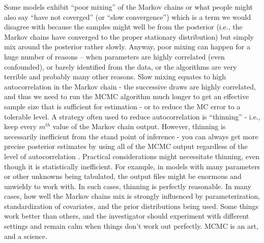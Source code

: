 Some models exhibit ``poor mixing'' of the Markov chains or what
people might also say ``have not coverged'' (or ``slow convergence'')
which is a term we would disagree with because the samples might well
be from the posterior (i.e., the Markov chains have converged to the
proper stationary distribution) but simply mix around the posterior
rather slowly. Anyway, poor mixing can happen for a huge number of
reasons -- when parameters are highly correlated (even confounded), or
barely identified from the data, or the algorithms are very terrible
and probably many other reasons.  Slow mixing equates to high
autocorrelation in the Markov chain - the successive draws are highly
correlated, and thus we need to run the MCMC algorithm much longer to
get an effective sample size that is sufficient for estimation - or to
reduce the MC error to a tolerable level.  A strategy often used to
reduce autocorrelation is ``thinning'' - i.e., keep every $m^{th}$
value of the Markov chain output. However, thinning is necessarily
inefficient from the stand point of inference - you can always get
more precise posterior estimates by using all of the MCMC output
regardless of the level of autocorrelation
\citep{maceachern_berliner:1994}. Practical considerations might
necessitate thinning, even though it is statistically inefficient. For
example, in models with many parameters or other unknowns being
tabulated, the output files might be enormous and unwieldy to work
with. In such cases, thinning is perfectly reasonable. In many cases,
how well the Markov chains mix is strongly influenced by
parameterization, standardization of covariates, and the prior
distributions being used. Some things work better than others, and the
investigator should experiment with different settings and
remain calm when things don't work out perfectly. MCMC is an
art, and a science.



